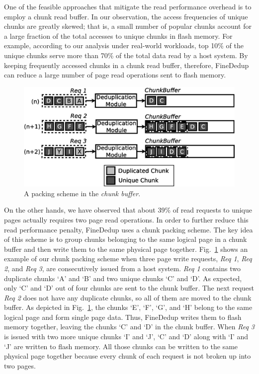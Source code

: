 One of the feasible approaches that mitigate the read performance overhead is to employ a chunk read buffer.
In our observation, 
the access frequencies of unique chunks are greatly skewed;
that is, a small number of popular chunks account for a large fraction of the total accesses to unique chunks in flash memory.
For example, according to our analysis under real-world workloads, 
top 10\% of the unique chunks serve more than 70\% of the total data read by a host system.
By keeping frequently accessed chunks in a chunk read buffer,
therefore, FineDedup can reduce a large number of page read operations sent to flash memory.

\begin{figure}[t]
	\center
	\includegraphics[scale=0.4]{figure/finededup/chunkbuffer}
	\caption{A packing scheme in the \textit{chunk buffer}.} %
	\label{fig:chunkbuffer}
\end{figure}

On the other hands, we have observed that about 39\% of read requests to unique pages actually requires two page read operations.
In order to further reduce this read performance penalty,
FineDedup uses a chunk packing scheme.
The key idea of this scheme is to
group chunks belonging to the same logical page in a chunk buffer and 
then write them to the same physical page together.
Fig.~\ref{fig:chunkbuffer} shows an example of our chunk packing scheme
when three page write requests, \textit{Req 1}, \textit{Req 2}, and \textit{Req 3}, are consecutively issued from a host system.
\textit{Req 1} contains two duplicate chunks `A' and `B' and two unique chunks `C' and `D'.
As expected, only `C' and `D' out of four chunks are sent to the chunk buffer.
The next request \textit{Req 2} does not have any duplicate chunks,
so all of them are moved to the chunk buffer.
As depicted in Fig.~\ref{fig:chunkbuffer},
the chunks `E', `F', `G', and `H' belong to the same logical page and form single page data.
Thus, FineDedup writes them to flash memory together,
leaving the chunks `C' and `D' in the chunk buffer.
When \textit{Req 3} is issued with two more unique chunks `I' and `J', 
`C' and `D' along with `I' and `J' are written to flash memory.
All those chunks can be written to the same physical page together
because every chunk of each request is not broken up into two pages.

